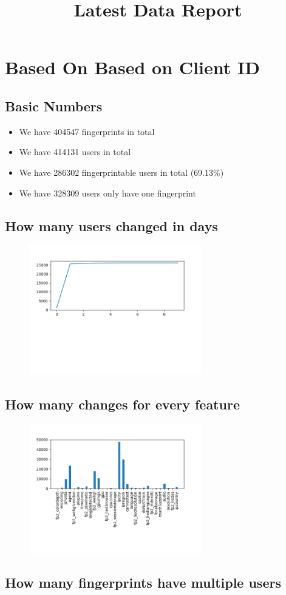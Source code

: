 \documentclass[10pt, conference, compsocconf]{IEEEtran}
\begin{document}
\title{Latest Data Report}
\author{
}
\maketitle
\section{Based On Based on Client ID}
\subsection{Basic Numbers}
\begin{itemize}\item We have 404547 fingerprints in total\item We have 414131 users in total\item We have 286302 fingerprintable users in total (69.13\%)\item We have 328309 users only have one fingerprint \end{itemize}\subsection{How many users changed in days}
\begin{figure}[H]\centering\includegraphics[width=75mm,scale=0.5]{BasedonClientIDchangebytime}\end{figure}\subsection{How many changes for every feature}
\begin{figure}[H]\centering\includegraphics[width=75mm,scale=0.5]{BasedonClientIDfeaturechange}\end{figure}\subsection{How many fingerprints have multiple users}
\end{document}
